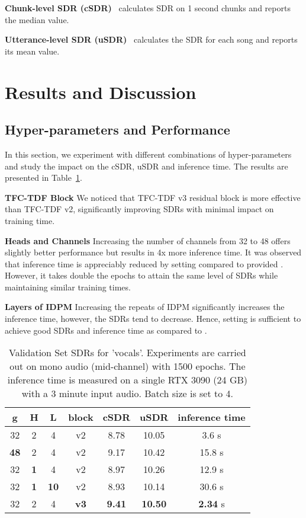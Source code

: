 \noindent \textbf{Chunk-level SDR (cSDR)}~\cite{SiSEC18} calculates SDR on 1 second chunks and reports the median value.


\noindent \textbf{Utterance-level SDR (uSDR)}~\cite{mitsufuji_music_2022} calculates the SDR for each song and reports its mean value.



\section{Results and Discussion}
\subsection{Hyper-parameters and Performance}
In this section, we experiment with different combinations of hyper-parameters and study the impact on the cSDR, uSDR and inference time. The results are presented in Table~\ref{tbl:hyer}.

\noindent \textbf{TFC-TDF Block} We noticed that TFC-TDF v3 residual block is more effective than TFC-TDF v2, significantly improving SDRs with minimal impact on training time.

\noindent \textbf{Heads and Channels} Increasing the number of channels  from 32 to 48 offers slightly better performance but results in 4x more inference time. It was observed that inference time is appreciably reduced by setting  compared to  provided . However, it takes double the epochs to attain the same level of SDRs while maintaining similar training times.

\noindent \textbf{Layers of IDPM} Increasing the repeats  of IDPM significantly increases the inference time, however, the SDRs tend to decrease. Hence, setting  is sufficient to achieve good SDRs and inference time as compared to .


\begin{table}[h]
    \centering
    \caption{Validation Set SDRs for 'vocals'. Experiments are carried out on mono audio (mid-channel) with 1500 epochs. The inference time is measured on a single RTX 3090 (24 GB) with a 3 minute input audio. Batch size is set to 4.}\label{tbl:hyer}
    \begin{tabular}{cccc|ccc}\hline
        g& H &  L& block&cSDR &uSDR & inference time\\\hline
        32 &2 &  4& v2& 8.78 & 10.05 & 3.6 s\\
\textbf{48}& 2 & 4& v2 & 9.17 & 10.42 & 15.8 s\\
        32 &\textbf{1} & 4& v2& 8.97 & 10.26 & 12.9 s\\
        32 & \textbf{1} &  \textbf{10}& v2 & 8.93 & 10.14 & 30.6 s\\
        32 &2 &  4& \textbf{v3}&\textbf{9.41}&\textbf{10.50}& \textbf{2.34} s
        \\\hline
    \end{tabular}
	
\end{table}





